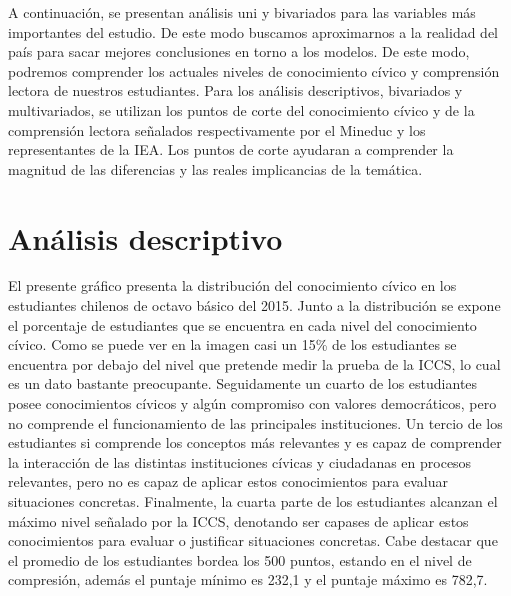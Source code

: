 \documentclass[12pt,twoside]{templates/facsothesis}
\begin{document}
A continuación, se presentan análisis uni y bivariados para las variables más importantes del estudio. De este modo buscamos aproximarnos a la realidad del país para sacar mejores conclusiones en torno a los modelos. De este modo, podremos comprender los actuales niveles de conocimiento cívico y comprensión lectora de nuestros estudiantes. Para los análisis descriptivos, bivariados y multivariados, se utilizan los puntos de corte del conocimiento cívico y de la comprensión lectora señalados respectivamente por el Mineduc y los representantes de la IEA. Los puntos de corte ayudaran a comprender la magnitud de las diferencias y las reales implicancias de la temática.

\hypertarget{anuxe1lisis-descriptivo}{%
\section{Análisis descriptivo}\label{anuxe1lisis-descriptivo}}

El presente gráfico presenta la distribución del conocimiento cívico en los estudiantes chilenos de octavo básico del 2015. Junto a la distribución se expone el porcentaje de estudiantes que se encuentra en cada nivel del conocimiento cívico. Como se puede ver en la imagen casi un 15\% de los estudiantes se encuentra por debajo del nivel que pretende medir la prueba de la ICCS, lo cual es un dato bastante preocupante. Seguidamente un cuarto de los estudiantes posee conocimientos cívicos y algún compromiso con valores democráticos, pero no comprende el funcionamiento de las principales instituciones. Un tercio de los estudiantes si comprende los conceptos más relevantes y es capaz de comprender la interacción de las distintas instituciones cívicas y ciudadanas en procesos relevantes, pero no es capaz de aplicar estos conocimientos para evaluar situaciones concretas. Finalmente, la cuarta parte de los estudiantes alcanzan el máximo nivel señalado por la ICCS, denotando ser capases de aplicar estos conocimientos para evaluar o justificar situaciones concretas. Cabe destacar que el promedio de los estudiantes bordea los 500 puntos, estando en el nivel de compresión, además el puntaje mínimo es 232,1 y el puntaje máximo es 782,7.
\end{document}
